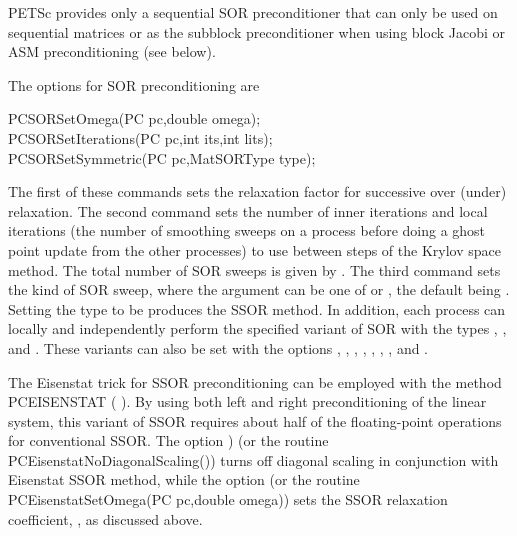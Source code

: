 PETSc provides only a sequential SOR preconditioner that can only be used on sequential 
matrices or as the subblock preconditioner when using block Jacobi or 
ASM preconditioning (see below).

The options for SOR   
preconditioning are 
\begin{tabbing}
  PCSORSetOmega(PC pc,double omega);\\
  PCSORSetIterations(PC pc,int its,int lits);\\
  PCSORSetSymmetric(PC pc,MatSORType type);
\end{tabbing}
The 
first of these commands sets the relaxation factor for successive
over (under) relaxation.  The second command sets the number of inner
iterations  and local iterations  
(the number of smoothing sweeps on a 
process before doing a ghost point update from the other processes)
to use between steps of the
Krylov space method. The total number of SOR sweeps is given by .
The third command sets the kind of SOR sweep,
where the argument  can be one of  or , the default
being . Setting the type to be  produces the SSOR method.  In addition, 
each process can locally and independently perform the specified 
variant of SOR with the types , 
, and .
These  
variants  
can  
also be set with the options , 
,  ,
,  , 
,  , and 
.
 
 
 

The Eisenstat trick \cite{eisenstat81}  for SSOR preconditioning 
can be employed with the method PCEISENSTAT 
( ).  
By using both left and right preconditioning of the linear system,
this variant of SSOR requires about half of the floating-point operations 
for conventional SSOR. The option 
) 
(or the routine PCEisenstatNoDiagonalScaling())
turns off diagonal scaling in conjunction with Eisenstat SSOR method, while
the option  (or the routine
PCEisenstatSetOmega(PC pc,double omega))
sets the SSOR relaxation coefficient, , as discussed above.


